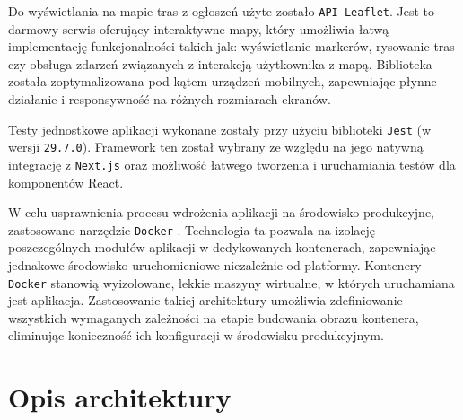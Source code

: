 Do wyświetlania na mapie tras z ogłoszeń użyte zostało \texttt{API Leaflet}. Jest to darmowy serwis oferujący interaktywne mapy, który umożliwia łatwą implementację funkcjonalności takich jak: wyświetlanie markerów, rysowanie tras czy obsługa zdarzeń związanych z interakcją użytkownika z mapą. Biblioteka została zoptymalizowana pod kątem urządzeń mobilnych, zapewniając płynne działanie i responsywność na różnych rozmiarach ekranów.

Testy jednostkowe aplikacji wykonane zostały przy użyciu biblioteki \texttt{Jest} \cite{Jest} (w wersji \texttt{29.7.0}). Framework ten został wybrany ze względu na jego natywną integrację z \texttt{Next.js} oraz możliwość łatwego tworzenia i uruchamiania testów dla komponentów React.

W celu usprawnienia procesu wdrożenia aplikacji na środowisko produkcyjne, zastosowano narzędzie \texttt{Docker} \cite{Docker}. Technologia ta pozwala na izolację poszczególnych modułów aplikacji w dedykowanych kontenerach, zapewniając jednakowe środowisko uruchomieniowe niezależnie od platformy. Kontenery \texttt{Docker} stanowią wyizolowane, lekkie maszyny wirtualne, w których uruchamiana jest aplikacja. Zastosowanie takiej architektury umożliwia zdefiniowanie wszystkich wymaganych zależności na etapie budowania obrazu kontenera, eliminując konieczność ich konfiguracji w środowisku produkcyjnym.

\pagebreak
\section{Opis architektury}
